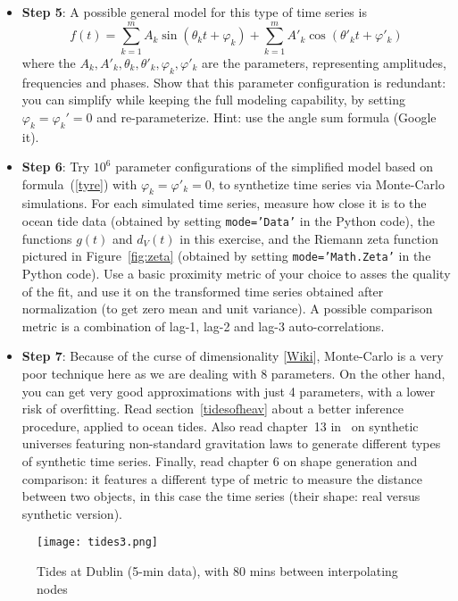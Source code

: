 \documentclass[oneside,10pt]{book}
\begin{document}
\begin{Exercise}
\begin{itemize}
\item[] {\bf Step 5}: A possible general model for this type of time series is
\begin{equation}
f(t) = \sum_{k=1}^m A_k \sin(\theta_kt + \varphi_k) + \sum_{k=1}^m A'_k \cos(\theta'_kt + \varphi'_k) \label{tyre}
\end{equation}
where the $A_k, A'_k, \theta_k,\theta'_k,\varphi_k,\varphi'_k$ are the parameters, representing amplitudes, frequencies and phases. Show that this parameter configuration is redundant:  you can simplify while keeping the full modeling capability, by setting
$\varphi_k = \varphi_k'=0$ and re-parameterize. Hint: use the angle sum formula (Google it).
\item[] {\bf Step 6}: Try $10^6$ parameter configurations of the simplified model based on formula~(\ref{tyre})
with $\varphi_k=\varphi'_k=0$, to
 synthetize time series via Monte-Carlo simulations. For each simulated time series, measure how close it is to the ocean tide data (obtained by setting \texttt{mode='Data'} in the Python code), the functions $g(t)$ and $d_V(t)$ in this exercise, and the Riemann zeta function pictured in Figure~\ref{fig:zeta} (obtained by setting
\texttt{mode='Math.Zeta'} in the Python code). Use a basic proximity metric of your choice to asses the quality of the fit, and use it
on the transformed time series obtained after normalization (to get zero mean and unit variance). A possible comparison metric is
a combination of  lag-1, lag-2 and lag-3 auto-correlations.
\item[] {\bf Step 7}: Because of the \textcolor{index}{curse of dimensionality} [\href{https://en.wikipedia.org/wiki/Curse_of_dimensionality}{Wiki}], Monte-Carlo is a very poor technique here as we are dealing with $8$ parameters. On the other hand, you can get very good approximations with just 4 parameters, with a lower risk of overfitting. Read section~\ref{tidesofheav} about a better inference procedure, applied to ocean tides.
Also read chapter~13 in~\cite{vgelsevier} on synthetic universes featuring non-standard gravitation laws to generate different types of  synthetic time series. Finally, read chapter 6 on shape generation and comparison: it features a different type of metric to measure the distance between two objects, in this case the time series (their shape: real versus synthetic version).
\end{itemize}
\end{Exercise}


\begin{figure}%
\centering
\texttt{[image: tides3.png]} %
\caption{Tides at Dublin (5-min data), with 80 mins between interpolating nodes}
\label{fig:tides}
\end{figure}
\end{document}
